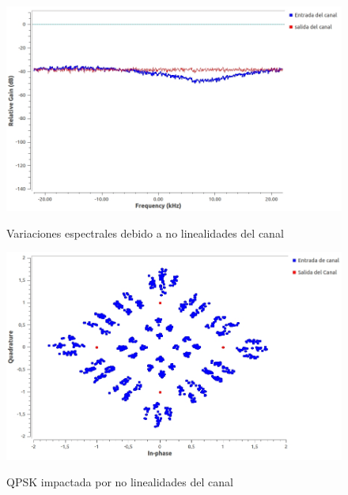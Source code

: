 \begin{figure}[h!]
	\captionsetup{justification = raggedright, singlelinecheck = false}
	\caption{Variaciones espectrales debido a no linealidades del canal} 
	\centering
	\includegraphics[scale=0.35]{Imagenes/canal_no_lineal.jpg}
	\label{fig:canal_no_lineal}
\end{figure}
\begin{figure}[h!]
	\captionsetup{justification = raggedright, singlelinecheck = false}
	\caption{QPSK impactada por no linealidades del canal} 
	\centering
	\includegraphics[scale=0.35]{Imagenes/qpsk_canal_no_lineal.jpg}
	\label{fig:qps_canal_no_lineal}
\end{figure}


